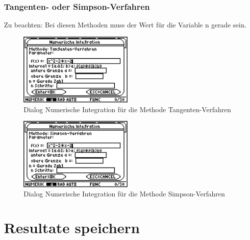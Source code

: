 \documentclass[a4paper,10pt]{scrreprt}
\begin{document}
\subsubsection*{Tangenten- oder Simpson-Verfahren}
Zu beachten: Bei diesen Methoden muss der Wert f\"ur die Variable n gerade sein.
\begin{figure}[h]
  \centering
  \includegraphics[width=0.5\textwidth]{img/nummeth_image028.png}
  \caption{Dialog Numerische Integration f\"ur die Methode Tangenten-Verfahren}
  \label{fig:ParameterIntegrationTangente}
\end{figure}
\begin{figure}[h]
  \centering
  \includegraphics[width=0.5\textwidth]{img/nummeth_image030.png}
  \caption{Dialog Numerische Integration f\"ur die Methode Simpson-Verfahren}
  \label{fig:ParameterIntegrationSimpson}
\end{figure}

\newpage
\section{Resultate speichern}
\end{document}

